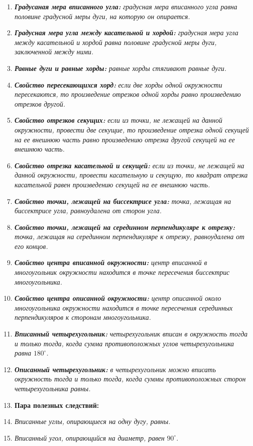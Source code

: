 \documentclass{article}
\begin{document}
\begin{enumerate}[label*=\protect\fbox{\arabic{enumi}}]
 \item [] \textbf{\textit{Градусаная мера вписанного угла:}} \textit{градусная мера вписанного угла равна половине градусной меры дуги, на которую он опирается.}
  \item [] \textbf{\textit{Градусная мера угла между касательной и хордой:}} \textit{градусная мера угла между касательной и хордой равна половине градусной меры дуги, заключенной между ними.}
  \item [] \textbf{\textit{Равные дуги и равные хорды:}} \textit{равные хорды стягивают равные дуги.}
 \item [] \textbf{\textit{Свойство пересекающихся хорд:}} \textit{если две хорды одной окружности пересекаются, то произведение отрезков одной хорды равно произведению отрезков другой.}
 \item [] \textbf{\textit{Свойство отрезков секущих:}} \textit{если из точки, не лежащей на данной окружности, провести две секущие, то произведение отрезка одной секущей на ее внешнюю часть равно произведению отрезка другой секущей на ее внешнюю часть.}
  \item [] \textbf{\textit{Свойство отрезка касательной и секущей:}} \textit{если из точки, не лежащей на данной окружности, провести касательную и секущую, то квадрат отрезка касательной равен произведению секущей на ее внешнюю часть.}
  \item [] \textbf{\textit{Свойство точки, лежащей на биссектрисе угла:}} \textit{точка, лежащая на биссектрисе угла, равноудалена от сторон угла.}
  \item [] \textbf{\textit{Свойство точки, лежащей на серединном перпендикуляре к отрезку:}} \textit{точка, лежащая на серединном перпендикуляре к отрезку, равноудалена от его концов.}
  \item [] \textbf{\textit{Свойство центра вписанной окружности:}} \textit{центр вписанной в многоугольник окружности находится в точке пересечения биссектрис многоугольника.}
  \item [] \textbf{\textit{Свойство центра описанной окружности:}} \textit{центр описанной около многоугольника окружности находится в точке пересечения серединных перпендикуляров к сторонам многоугольника.}
  \item [] \textbf{\textit{Вписанный четырехугольник:}} \textit{четырехугольник вписан в окружность тогда и только тогда, когда сумма противоположных углов четырехугольника равна $180^{\circ}$.}
  \item [] \textbf{\textit{Описанный четырехугольник:}} \textit{в четырехугольник можно вписать окружность тогда и только тогда, когда суммы противоположных сторон четырехугольника равны.}
  \item []  {\bf Пара полезных следствий:}\large
  \item [] \textit{Вписанные углы, опирающиеся на одну дугу, равны.}
  \item [] \textit{Вписанный угол, опирающийся на диаметр, равен $90^{\circ}$.}
  

\end{enumerate}
\end{document}
